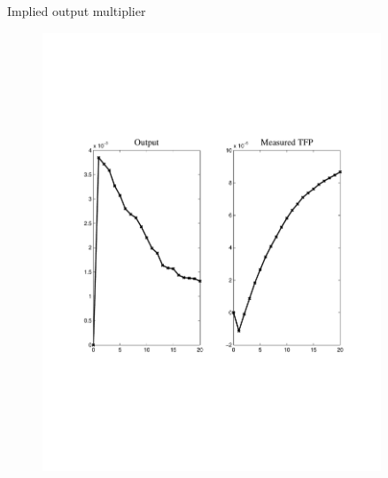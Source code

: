 \documentclass[svgnames]{beamer}
\begin{document}
\begin{frame}{Implied output multiplier}
\begin{figure}[!ht]
\includegraphics[trim=1cm 6.5cm 1cm 6.5cm, clip=true, width=0.9\textwidth]{graph/GShockOutput.pdf}
\end{figure}
\end{frame}
\end{document}
